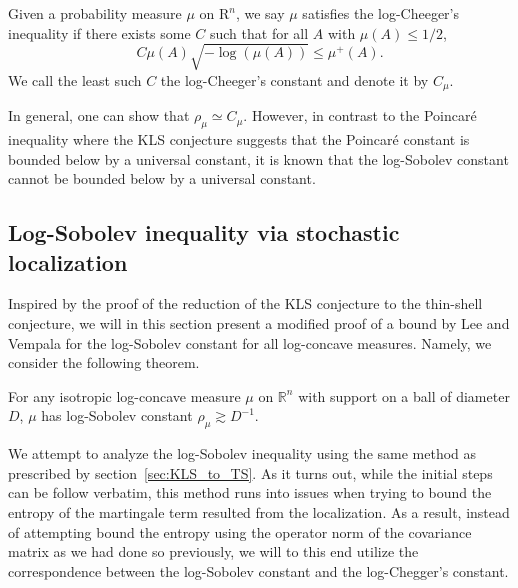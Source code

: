 \begin{definition}
  Given a probability measure \(\mu\) on \(\mbox{R}^n\), we say \(\mu\) satisfies the log-Cheeger's inequality 
  if there exists some \(C\) such that for all \(A\) with \(\mu(A) \le 1 / 2\),
  \[C\mu(A)\sqrt{-\log(\mu(A))} \le \mu^+(A).\]
  We call the least such \(C\) the log-Cheeger's constant and denote it by \(C_\mu\).
\end{definition}

In general, one can show that \(\rho_\mu \simeq C_\mu\). However, in contrast to the Poincaré inequality where 
the KLS conjecture suggests that the Poincaré constant is bounded below by a universal constant, it is known 
that the log-Sobolev constant cannot be bounded below by a universal constant. 

\subsection{Log-Sobolev inequality via stochastic localization}

Inspired by the proof of the reduction of the KLS conjecture to the thin-shell conjecture, we will in this section 
present a modified proof of a bound by Lee and Vempala for the log-Sobolev constant for all log-concave measures. 
Namely, we consider the following theorem. 

\begin{theorem}
  For any isotropic log-concave measure \(\mu\) on \(\mathbb{R}^n\) with support on a ball of diameter \(D\), 
  \(\mu\) has log-Sobolev constant \(\rho_\mu \gtrsim D^{-1}\).
\end{theorem}

We attempt to analyze the log-Sobolev inequality using the same method as prescribed by section~\ref{sec:KLS_to_TS}. 
As it turns out, while the initial steps can be follow verbatim, this method runs into issues when trying to 
bound the entropy of the martingale term resulted from the localization. As a result, instead of attempting 
bound the entropy using the operator norm of the covariance matrix as we had done so previously, we will 
to this end utilize the correspondence between the log-Sobolev constant and the log-Chegger's constant.

